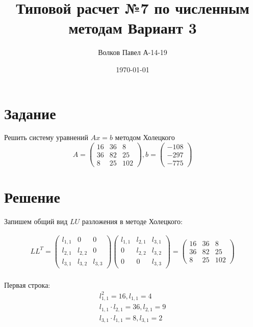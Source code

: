 \documentclass[a4paper,12pt]{report} %
\author{Волков Павел А-14-19}
\title{Типовой расчет №7 по численным методам Вариант 3}
\date{\today}
\begin{document}

\maketitle

\newpage
\section*{Задание}
Решить систему уравнений $Ax = b$ методом Холецкого
\[
	A = 
	\begin{pmatrix}
		16 & 36 & 8\\
		36 & 82 & 25\\
		8 & 25 & 102
	\end{pmatrix}, b = 
	\begin {pmatrix}
		-108 \\ -297 \\ -775
	\end{pmatrix}
\]

\section*{Решение}

Запишем общий вид $LU$ разложения в методе Холецкого:

\begin{gather*}
	LL^T = 
	\begin{pmatrix}
		l_{1,1} & 0 & 0 \\
		l_{2,1} & l_{2,2} & 0 \\
		l_{3,1} & l_{3,2} & l_{3,3}
	\end{pmatrix}
		\begin{pmatrix}
		l_{1,1} & l_{2,1} & l_{3,1} \\
		0  & l_{2,2} & l_{3,2}\\
		0 & 0 & l_{3,3}
	\end{pmatrix} = 
	\begin{pmatrix}
		16 & 36 & 8\\
		36 & 82 & 25\\
		8 & 25 & 102
	\end{pmatrix} \\
\end{gather*}

Первая строка:
\begin{gather*}
	l_{1,1}^2 = 16, l_{1,1} = 4 \\
	l_{1,1} \cdot l_{2,1} = 36, l_{2,1} = 9 \\
	l_{3,1} \cdot l_{1,1} = 8, l_{3,1} = 2
\end{gather*}
\end{document}
